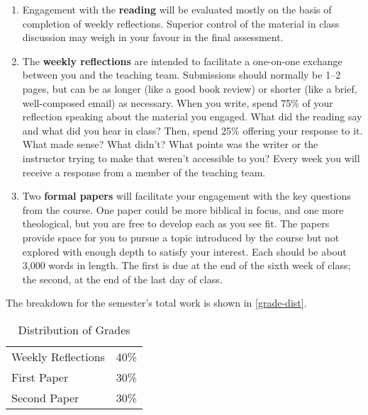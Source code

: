 \documentclass[titlepage]{article}
\begin{document}
\begin{enumerate}

	\item Engagement with the \textbf{reading} will be evaluated mostly
	on the basis of completion of weekly reflections. Superior control
	of the material in class discussion may weigh in your favour in the
	final assessment.

	\item The \textbf{weekly reflections} are intended to facilitate a
	one-on-one exchange between you and the teaching team. Submissions
	should normally be 1–2 pages, but can be as longer (like a good book
	review) or shorter (like a brief, well-composed email) as necessary.
	When you write, spend 75\% of your reflection speaking about the
	material you engaged. What did the reading say and what did you hear
	in class? Then, spend 25\% offering your response to it. What made
	sense? What didn’t? What points was the writer or the instructor
	trying to make that weren’t accessible to you? Every week you will
	receive a response from a member of the teaching team.

	\item Two \textbf{formal papers} will facilitate your engagement
	with the key questions from the course. One paper could be more
	biblical in focus, and one more theological, but you are free to
	develop each as you see fit. The papers provide space for you to
	pursue a topic introduced by the course but not explored with enough
	depth to satisfy your interest. Each should be about 3,000 words in
	length. The first is due at the end of the sixth week of class; the
	second, at the end of the last day of class.

\end{enumerate}

The breakdown for the semester's total work is shown in
\autoref{grade-dist}.

\begin{table}[htbp]
  \centering
  {\lining
  \begin{tabular}{lr}
    \toprule
    Weekly Reflections & 40\% \\
    First Paper        & 30\% \\
    Second Paper       & 30\% \\
    \bottomrule
  \end{tabular}}
  \caption{Distribution of Grades}
  \label{grade-dist}
\end{table}

\end{document}
